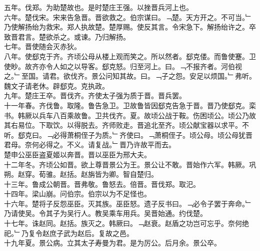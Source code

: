 \documentclass{zhvt-classic}
\begin{document}
\hspace*{2em}五年。伐郑。为助楚故也。是时楚庄王强。以挫晋兵河上也。\\
\hspace*{2em}六年。楚伐宋。宋来告急晋。晋欲救之。伯宗谋曰。﹁楚。天方开之。不可当。﹂乃使解扬绐为救宋。郑人执故楚。楚厚赐。使反其言。令宋急下。解扬绐许之。卒致晋君言。楚欲杀之。或谏。乃归解扬。\\
\hspace*{2em}七年。晋使随会灭赤狄。\\
\hspace*{2em}八年。使郄克于齐。齐顷公母从楼上观而笑之。所以然者。郄克偻。而鲁使蹇。卫使眇。故齐亦令人如之以导客。郄克怒。归至河上。曰。﹁不报齐者。河伯视之。﹂至国。请君。欲伐齐。景公问知其故。曰。﹁子之怨。安足以烦国。﹂弗听。魏文子请老休。辟郄克。克执政。\\
\hspace*{2em}九年。楚庄王卒。晋伐齐。齐使太子强为质于晋。晋兵罢。\\
\hspace*{2em}十一年春。齐伐鲁。取隆。鲁告急卫。卫故鲁皆因郄克告急于晋。晋乃使郄克。栾书。韩厥以兵车八百乘故鲁。卫共伐齐。夏。故顷公战于鞍。伤困顷公。顷公乃故其右易位。下取饮。以得脱去。齐师败走。晋追北至齐。顷公献宝器以求平。不听。郄克曰。﹁必得萧桐侄子为质。﹂齐使曰。﹁萧桐侄子。顷公母。顷公母犹晋君母。奈何必得之。不义。请复战。﹂晋乃许故平而去。\\
\hspace*{2em}楚申公巫臣盗夏姬以奔晋。晋以巫臣为邢大夫。\\
\hspace*{2em}十二年冬。齐顷公如晋。欲上尊晋景公为王。景公让不敢。晋始作六军。韩厥。巩朔。赵穿。荀骓。赵括。赵旃皆为卿。智自楚归。\\
\hspace*{2em}十三年。鲁成公朝晋。晋弗敬。鲁怒去。倍晋。晋伐郑。取汜。\\
\hspace*{2em}十四年。梁山崩。问伯宗。伯宗以为不足怪也。\\
\hspace*{2em}十六年。楚将子反怨巫臣。灭其族。巫臣怒。遗子反书曰。﹁必令子罢于奔命。﹂乃请使吴。令其子为吴行人。教吴乘车用兵。吴晋始通。约伐楚。\\
\hspace*{2em}十七年。诛赵同。赵括。族灭之。韩厥曰。﹁赵衰。赵盾之功岂可忘乎。奈何绝祀。﹂乃复令赵庶子武为赵后。复故之邑。\\
\hspace*{2em}十九年夏。景公病。立其太子寿曼为君。是为厉公。后月余。景公卒。\\
\end{document}
